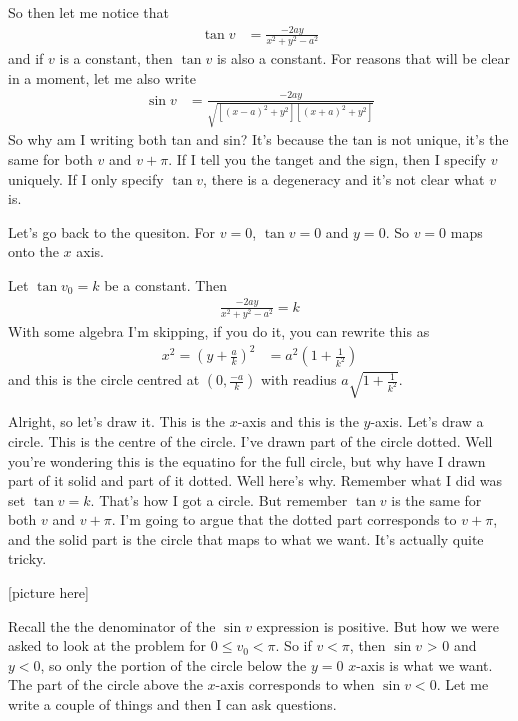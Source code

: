 So then let me notice that
\begin{align}
    \tan v &=
    \frac{-2ay}{x^2 + y^2 - a^2}
\end{align}
and if $v$ is a constant, then $\tan v$ is also a constant.
For reasons that will be clear in a moment,
let me also write
\begin{align}
    \sin v &=
    \frac{-2ay}{\sqrt{
        [(x - a)^2 + y^2]
        [(x + a)^2 + y^2]
    }}
\end{align}
So why am I writing both tan and sin?
It's because the tan is not unique,
it's the same for both $v$ and $v+\pi$.
If I tell you the tanget and the sign,
then I specify $v$ uniquely.
If I only specify $\tan v$,
there is a degeneracy and it's not clear what $v$ is.

Let's go back to the quesiton.
For $v=0$, $\tan v =0 $ and $y=0$.
So $v=0$ maps onto the $x$ axis.

Let $\tan v_0 = k$ be a constant.
Then
\begin{align}
    \frac{-2ay}{x^2 + y^2 - a^2} = k
\end{align}
With some algebra I'm skipping,
if you do it,
you can rewrite this as
\begin{align}
    x^2 = \left( y + \frac{a}{k} \right)^2
    &=
    a^2 \left( 1 + \frac{1}{k^2} \right)
\end{align}
and this is the circle centred at
$\left( 0, \frac{-a}{k} \right)$
with readius
$a\sqrt{1 + \frac{1}{k^2}}$.

Alright,
so let's draw it.
This is the $x$-axis and this is the $y$-axis.
Let's draw a circle.
This is the centre of the circle.
I've drawn part of the circle dotted.
Well you're wondering this is the equatino for the full circle,
but why have I drawn part of it solid and part of it dotted.
Well here's why.
Remember what I did was set $\tan v = k$.
That's how I got a circle.
But remember $\tan v$ is the same for both $v$ and $v+\pi$.
I'm going to argue that the dotted part corresponds to $v+\pi$,
and the solid part is the circle that maps to what we want.
It's actually quite tricky.

[picture here]

Recall the the denominator of the $\sin v$ expression is positive.
But how we were asked to look at the problem for $0\le v_0< \pi$.
So if $v < \pi$, then $\sin v$ > 0 and $y <0$,
so only the portion of the circle below the $y=0$ $x$-axis is what we want.
The part of the circle above the $x$-axis corresponds to when
$\sin v < 0$.
Let me write a couple of things and then I can ask questions.


